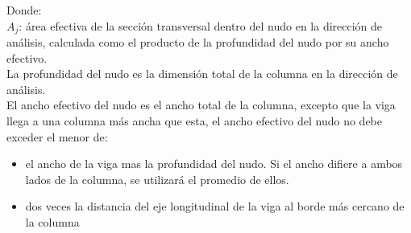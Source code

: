 \documentclass[12pt]{article}
\begin{document}
        \noindent Donde: \\
        $A_j$: área efectiva de la sección transversal dentro del nudo en la dirección de análisis, calculada como el producto de la profundidad del nudo por su ancho efectivo.\\
        La profundidad del nudo es la dimensión total de la columna en la dirección de análisis.\\
        El ancho efectivo del nudo es el ancho total de la columna, excepto que la viga llega a una columna más ancha que esta, el ancho efectivo del nudo no debe exceder el menor de:
        \begin{itemize}
            \item el ancho de la viga mas la profundidad del nudo. Si el ancho difiere a ambos lados de la columna, se utilizará el promedio de ellos.
            \item dos veces la distancia del eje longitudinal de la viga al borde más cercano de la columna
        \end{itemize}        
        
\end{document}

